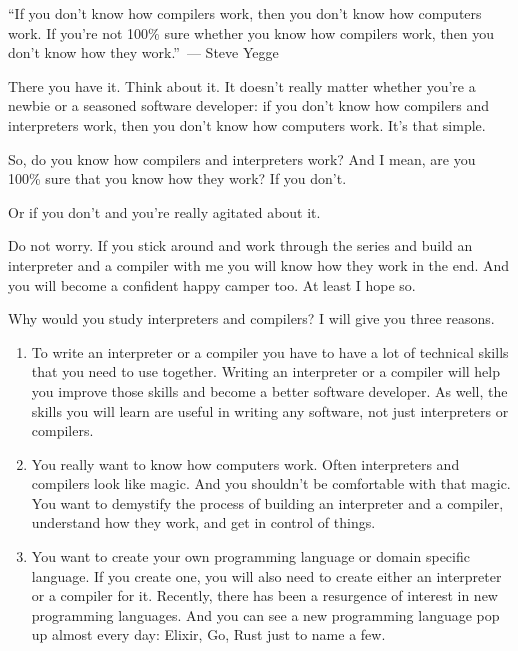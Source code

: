 
“If you don’t know how compilers work, then you don’t know how computers work.
If you’re not 100\% sure whether you know how compilers work, then you don’t
know how they work.”\ --- Steve Yegge

There you have it. Think about it. It doesn’t really matter whether you’re a
newbie or a seasoned software developer: if you don’t know how compilers and
interpreters work, then you don’t know how computers work. It’s that simple.

So, do you know how compilers and interpreters work? And I mean, are you 100\%
sure that you know how they work? If you don’t. 
\begin{framed}\end{framed}
Or if you don’t and you’re really agitated about it. 
\begin{framed}\end{framed}

Do not worry. If you stick around and work through the series and build an
interpreter and a compiler with me you will know how they work in the end. And
you will become a confident happy camper too. At least I hope so.
\begin{framed}\end{framed}

Why would you study interpreters and compilers? I will give you three reasons.
\begin{enumerate}
  \item 
To write an interpreter or a compiler you have to have a lot of technical skills
that you need to use together. Writing an interpreter or a compiler will help
you improve those skills and become a better software developer. As well, the
skills you will learn are useful in writing any software, not just interpreters
or compilers.
  \item 
You really want to know how computers work. Often interpreters and compilers
look like magic. And you shouldn’t be comfortable with that magic. You want to
demystify the process of building an interpreter and a compiler, understand how
they work, and get in control of things.
  \item 
You want to create your own programming language or domain specific language. If
you create one, you will also need to create either an interpreter or a compiler
for it. Recently, there has been a resurgence of interest in new programming
languages. And you can see a new programming language pop up almost every day:
Elixir, Go, Rust just to name a few.
\end{enumerate}

